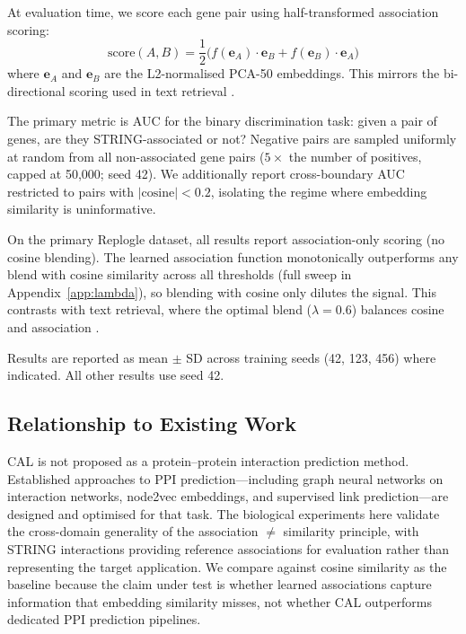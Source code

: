 \documentclass[11pt]{article}
\begin{document}
At evaluation time, we score each gene pair using half-transformed association scoring:
\begin{equation}
\text{score}(A, B) = \frac{1}{2}\bigl(f(\mathbf{e}_A) \cdot \mathbf{e}_B + f(\mathbf{e}_B) \cdot \mathbf{e}_A\bigr)
\label{eq:scoring}
\end{equation}
where $\mathbf{e}_A$ and $\mathbf{e}_B$ are the L2-normalised PCA-50 embeddings. This mirrors the bi-directional scoring used in text retrieval \citep{dury2026aar}.

The primary metric is AUC for the binary discrimination task: given a pair of genes, are they STRING-associated or not? Negative pairs are sampled uniformly at random from all non-associated gene pairs ($5\times$ the number of positives, capped at 50,000; seed 42). We additionally report cross-boundary AUC restricted to pairs with $|\text{cosine}| < 0.2$, isolating the regime where embedding similarity is uninformative.

On the primary Replogle dataset, all results report association-only scoring (no cosine blending). The learned association function monotonically outperforms any blend with cosine similarity across all thresholds (full sweep in Appendix~\ref{app:lambda}), so blending with cosine only dilutes the signal. This contrasts with text retrieval, where the optimal blend ($\lambda = 0.6$) balances cosine and association \citep{dury2026aar}.

Results are reported as mean $\pm$ SD across training seeds (42, 123, 456) where indicated. All other results use seed 42.

\subsection{Relationship to Existing Work}
\label{sec:related}

CAL is not proposed as a protein--protein interaction prediction method. Established approaches to PPI prediction---including graph neural networks on interaction networks, node2vec embeddings, and supervised link prediction---are designed and optimised for that task. The biological experiments here validate the cross-domain generality of the association $\neq$ similarity principle, with STRING interactions providing reference associations for evaluation rather than representing the target application. We compare against cosine similarity as the baseline because the claim under test is whether learned associations capture information that embedding similarity misses, not whether CAL outperforms dedicated PPI prediction pipelines.
\end{document}
